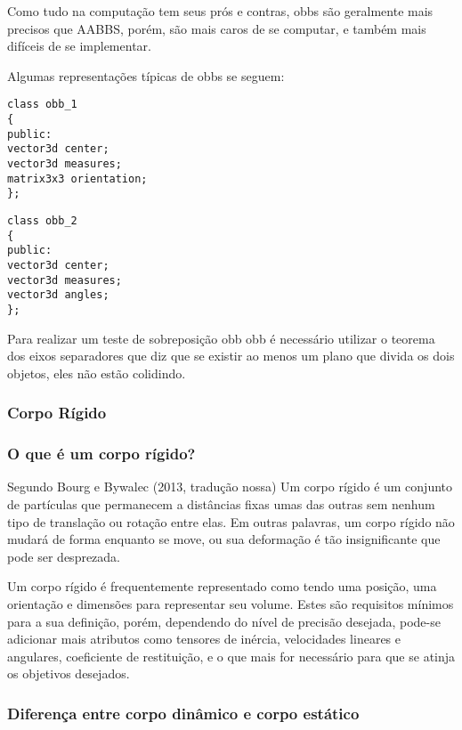 Como tudo na computação tem seus prós e contras, obbs são geralmente mais
precisos que AABBS, porém, são mais caros de se computar, e também mais
difíceis de se implementar.


Algumas representações típicas de obbs se seguem:

\begin{lstlisting}[frame=single,caption=Código de exemplo de OBB\label{code:obb_1}]
class obb_1
{
public:
vector3d center;
vector3d measures;
matrix3x3 orientation;
};
\end{lstlisting}

\begin{lstlisting}[frame=single,caption=Exemplo de OBB\label{code:obb_2}]
class obb_2
{
public:
vector3d center;
vector3d measures;
vector3d angles;
};
\end{lstlisting}

Para realizar um teste de sobreposição obb obb é necessário utilizar o teorema
dos eixos separadores que diz que se existir ao menos um plano que divida os
dois objetos, eles não estão colidindo.



\subsubsection{ Corpo Rígido}
\subsubsection{ O que é um corpo rígido?}

Segundo Bourg e Bywalec (2013, tradução nossa) Um corpo rígido é um conjunto de partículas  que permanecem a distâncias fixas umas das outras  sem nenhum tipo de translação ou rotação entre elas. Em outras palavras,  um corpo rígido não mudará de forma enquanto se move, ou sua deformação é tão insignificante que pode ser desprezada.

Um corpo rígido é  frequentemente representado como tendo uma posição, uma orientação  e  dimensões para representar seu volume. Estes são requisitos mínimos para a  sua definição, porém, dependendo do nível de precisão desejada, pode-se adicionar mais atributos como tensores de inércia, velocidades lineares e angulares, coeficiente de restituição, e o que mais for necessário para que se atinja os objetivos desejados.

\subsubsection{ Diferença entre corpo dinâmico e corpo estático}

